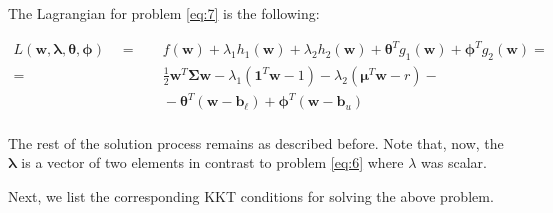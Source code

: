 \documentclass{beamer}
\begin{document}
\begin{frame}

\justifying
The Lagrangian for problem \eqref{eq:7} is the following:

\justifying
\begin{equation*}
\begin{aligned}
	L\left(\mathbf{w},\boldsymbol\lambda,\boldsymbol\theta,\boldsymbol\phi\right) \quad = & \quad f\left(\mathbf{w}\right) + \lambda_{1} h_{1}\left(\mathbf{w}\right) + \lambda_{2} h_{2}\left(\mathbf{w}\right) + \boldsymbol\theta^{T} g_{1}\left(\mathbf{w}\right) + \boldsymbol\phi^{T} g_{2}\left(\mathbf{w}\right) = \\
	 = & \quad \frac{1}{2}\mathbf{w}^{T}\mathbf{\Sigma}\mathbf{w} - \lambda_{1} \left(\mathbf{1}^{T} \mathbf{w} - 1\right) - \lambda_{2} \left(\boldsymbol\mu^{T} \mathbf{w} - r\right) - \\
	 & \quad - \boldsymbol\theta^{T} \left( \mathbf{w}-\mathbf{b}_{\ell} \right) + \boldsymbol\phi^{T} \left( \mathbf{w}-\mathbf{b}_{u} \right)\\
\end{aligned}
\end{equation*}

\vspace{0.4cm}
\justifying
The rest of the solution process remains as described before. Note that, now, the $\boldsymbol\lambda$ is a vector of two elements in contrast to problem \eqref{eq:6} where $\lambda$ was scalar.

\vspace{0.4cm}
\justifying
Next, we list the corresponding KKT conditions for solving the above problem.

\end{frame}
\end{document}
